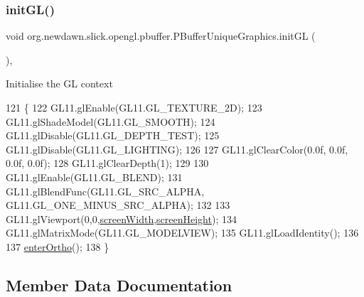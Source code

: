 \mbox{\label{classorg_1_1newdawn_1_1slick_1_1opengl_1_1pbuffer_1_1_p_buffer_unique_graphics_ac96d393e734949dafa1894e2b5e329e8}} 
\subsubsection{\texorpdfstring{init\+G\+L()}{initGL()}}
{\footnotesize\ttfamily void org.\+newdawn.\+slick.\+opengl.\+pbuffer.\+P\+Buffer\+Unique\+Graphics.\+init\+GL (\begin{DoxyParamCaption}{ }\end{DoxyParamCaption})\hspace{0.3cm}{\ttfamily [inline]}, {\ttfamily [protected]}}

Initialise the GL context 
\begin{DoxyCode}
121                             \{
122         GL11.glEnable(GL11.GL\_TEXTURE\_2D);
123         GL11.glShadeModel(GL11.GL\_SMOOTH);        
124         GL11.glDisable(GL11.GL\_DEPTH\_TEST);
125         GL11.glDisable(GL11.GL\_LIGHTING);                    
126         
127         GL11.glClearColor(0.0f, 0.0f, 0.0f, 0.0f);                
128         GL11.glClearDepth(1);                                       
129         
130         GL11.glEnable(GL11.GL\_BLEND);
131         GL11.glBlendFunc(GL11.GL\_SRC\_ALPHA, GL11.GL\_ONE\_MINUS\_SRC\_ALPHA);
132         
133         GL11.glViewport(0,0,\mbox{\hyperlink{classorg_1_1newdawn_1_1slick_1_1_graphics_adbb4b10050a8bcf8e496130509784f71}{screenWidth}},\mbox{\hyperlink{classorg_1_1newdawn_1_1slick_1_1_graphics_a24cd14275ad2dcd82fcd843ceab6a80b}{screenHeight}});
134         GL11.glMatrixMode(GL11.GL\_MODELVIEW);
135         GL11.glLoadIdentity();
136         
137         \mbox{\hyperlink{classorg_1_1newdawn_1_1slick_1_1opengl_1_1pbuffer_1_1_p_buffer_unique_graphics_a3331dd0ca3d82959b02bdfe4be9a274b}{enterOrtho}}();
138     \}
\end{DoxyCode}


\subsection{Member Data Documentation}
\mbox{\label{classorg_1_1newdawn_1_1slick_1_1opengl_1_1pbuffer_1_1_p_buffer_unique_graphics_abc5d45be7087d1aeb486c2fae5c194ca}} 
